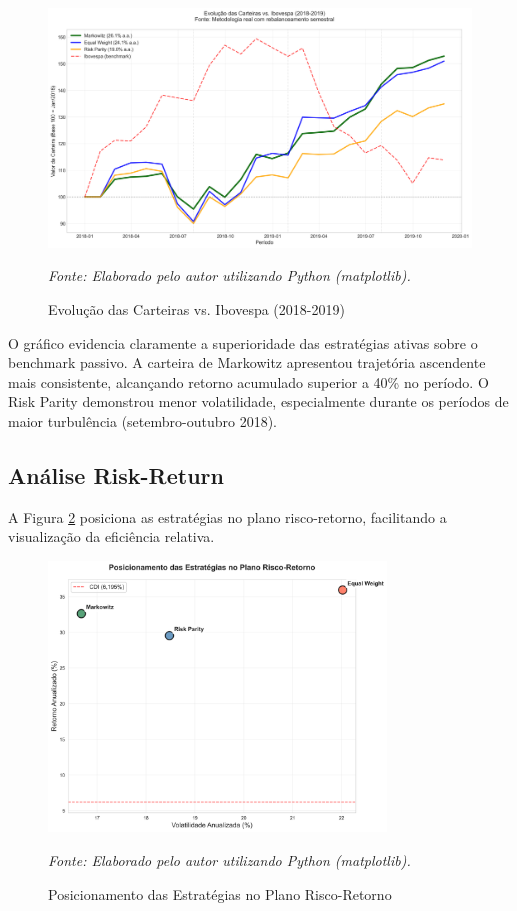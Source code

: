 \begin{figure}[H]
\centering
\includegraphics[width=\textwidth]{images/portfolio_evolution.png}
\caption{Evolução das Carteiras vs. Ibovespa (2018-2019)}
\textit{Fonte: Elaborado pelo autor utilizando Python (matplotlib).}
\label{fig:portfolio_evolution}
\end{figure}

O gráfico evidencia claramente a superioridade das estratégias ativas sobre o benchmark passivo. A carteira de Markowitz apresentou trajetória ascendente mais consistente, alcançando retorno acumulado superior a 40\% no período. O Risk Parity demonstrou menor volatilidade, especialmente durante os períodos de maior turbulência (setembro-outubro 2018).

\subsection{Análise Risk-Return}

A Figura \ref{fig:risk_return} posiciona as estratégias no plano risco-retorno, facilitando a visualização da eficiência relativa.

\begin{figure}[H]
\centering
\includegraphics[width=0.8\textwidth]{images/risk_return_plot.png}
\caption{Posicionamento das Estratégias no Plano Risco-Retorno}
\textit{Fonte: Elaborado pelo autor utilizando Python (matplotlib).}
\label{fig:risk_return}
\end{figure}

